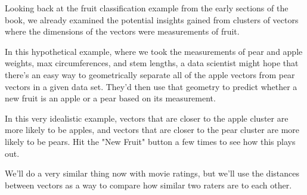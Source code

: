 \documentclass{ximera}
\begin{document}
  \begin{example}
    

  Looking back at the fruit classification example from the early sections of the book, we already examined the potential insights gained from clusters of vectors where the dimensions of the vectors were measurements of fruit. 

    In this hypothetical example, where we took the measurements of pear and apple weights, max circumferences, and stem lengths, a data scientist might hope that there's an easy way to geometrically separate all of the apple vectors from pear vectors in a given data set. They'd then use that geometry to predict whether a new fruit is an apple or a pear based on its measurement. 


    \begin{center}
    \end{center}

    In this very idealistic example, vectors that are closer to the apple cluster are more likely to be apples, and vectors that are closer to the pear cluster are more likely to be pears. Hit the "New Fruit" button a few times to see how this plays out.

    We'll do a very similar thing now with movie ratings, but we'll use the distances between vectors as a way to compare how similar two raters are to each other.

    
\end{example}
\end{document}
